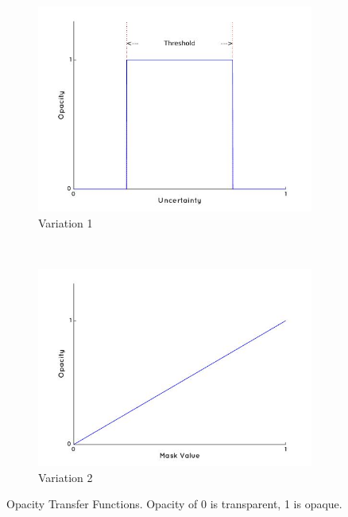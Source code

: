 \begin{figure}[H]
  \centering
  \begin{subfigure}[b]{0.5\textwidth}
    \includegraphics[width=\textwidth]{images/thresholding/thresholdvariation1.jpg}
    \caption{Variation 1}
    \label{fig:thresholdingvariation1}
  \end{subfigure}%
  ~ %
  \begin{subfigure}[b]{0.5\textwidth}
    \includegraphics[width=\textwidth]{images/thresholding/thresholdvariation2.jpg}
    \caption{Variation 2}
    \label{fig:thresholdingvariation2}
  \end{subfigure}
  \caption{Opacity Transfer Functions. Opacity of 0 is transparent, 1 is opaque.}\label{fig:thresholdingoverview}
\end{figure}

